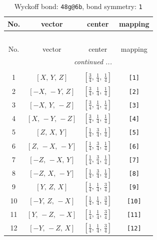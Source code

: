 \documentclass[fleqn,8pt]{jsarticle}
\begin{document}
\begin{longtable}{cccc}
\caption{Wyckoff bond: {\tt 48g@6b}, bond symmetry: {\tt 1}}
 \\
 \hline \hline
No. & vector & center & mapping \\ \hline \endfirsthead

\multicolumn{3}{l}{\tablename\ \thetable{}} \\
 \hline \hline
No. & vector & center & mapping \\ \hline \endhead

 \hline \hline
\multicolumn{3}{r}{\footnotesize\it continued ...} \\ \endfoot

 \hline \hline
\multicolumn{3}{r}{} \\ \endlastfoot

1 & $\left[ X,\, Y,\, Z \right]$ & $\left[ \frac{3}{4},\, \frac{1}{4},\, \frac{1}{4} \right]$ & {\tt [1]} \\ \hline
2 & $\left[ - X,\, - Y,\, Z \right]$ & $\left[ \frac{3}{4},\, \frac{1}{4},\, \frac{1}{4} \right]$ & {\tt [2]} \\ \hline
3 & $\left[ - X,\, Y,\, - Z \right]$ & $\left[ \frac{3}{4},\, \frac{1}{4},\, \frac{1}{4} \right]$ & {\tt [3]} \\ \hline
4 & $\left[ X,\, - Y,\, - Z \right]$ & $\left[ \frac{3}{4},\, \frac{1}{4},\, \frac{1}{4} \right]$ & {\tt [4]} \\ \hline
5 & $\left[ Z,\, X,\, Y \right]$ & $\left[ \frac{1}{4},\, \frac{3}{4},\, \frac{1}{4} \right]$ & {\tt [5]} \\ \hline
6 & $\left[ Z,\, - X,\, - Y \right]$ & $\left[ \frac{1}{4},\, \frac{3}{4},\, \frac{1}{4} \right]$ & {\tt [6]} \\ \hline
7 & $\left[ - Z,\, - X,\, Y \right]$ & $\left[ \frac{1}{4},\, \frac{3}{4},\, \frac{1}{4} \right]$ & {\tt [7]} \\ \hline
8 & $\left[ - Z,\, X,\, - Y \right]$ & $\left[ \frac{1}{4},\, \frac{3}{4},\, \frac{1}{4} \right]$ & {\tt [8]} \\ \hline
9 & $\left[ Y,\, Z,\, X \right]$ & $\left[ \frac{1}{4},\, \frac{1}{4},\, \frac{3}{4} \right]$ & {\tt [9]} \\ \hline
10 & $\left[ - Y,\, Z,\, - X \right]$ & $\left[ \frac{1}{4},\, \frac{1}{4},\, \frac{3}{4} \right]$ & {\tt [10]} \\ \hline
11 & $\left[ Y,\, - Z,\, - X \right]$ & $\left[ \frac{1}{4},\, \frac{1}{4},\, \frac{3}{4} \right]$ & {\tt [11]} \\ \hline
12 & $\left[ - Y,\, - Z,\, X \right]$ & $\left[ \frac{1}{4},\, \frac{1}{4},\, \frac{3}{4} \right]$ & {\tt [12]} \\ \hline

\end{longtable}
\end{document}

